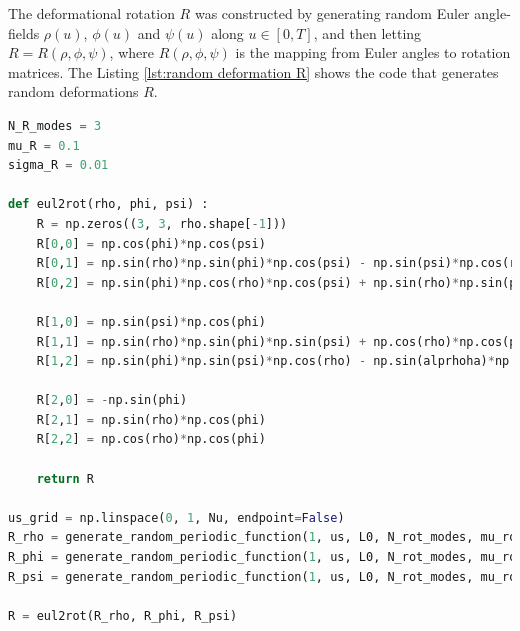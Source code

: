 \documentclass[withindex,glossary,techreport]{cam-thesis}
\begin{document}
\begin{appendices}
The deformational rotation $R$ was constructed by generating random Euler angle-fields $\rho(u)$, $\phi(u)$ and $\psi(u)$ along $u \in [0, T]$, and then letting $R = R(\rho, \phi, \psi)$, where $R(\rho, \phi, \psi)$ is the mapping from Euler angles to rotation matrices. The Listing \ref{lst:random deformation R} shows the code that generates random deformations $R$.

\begin{lstlisting}[language=Python, caption=Generating random deformational rotation field., label={lst:random deformation R}]
N_R_modes = 3
mu_R = 0.1
sigma_R = 0.01

def eul2rot(rho, phi, psi) :
    R = np.zeros((3, 3, rho.shape[-1]))
    R[0,0] = np.cos(phi)*np.cos(psi)
    R[0,1] = np.sin(rho)*np.sin(phi)*np.cos(psi) - np.sin(psi)*np.cos(rho)
    R[0,2] = np.sin(phi)*np.cos(rho)*np.cos(psi) + np.sin(rho)*np.sin(psi)
    
    R[1,0] = np.sin(psi)*np.cos(phi)
    R[1,1] = np.sin(rho)*np.sin(phi)*np.sin(psi) + np.cos(rho)*np.cos(psi)
    R[1,2] = np.sin(phi)*np.sin(psi)*np.cos(rho) - np.sin(alprhoha)*np.cos(psi)
    
    R[2,0] = -np.sin(phi)
    R[2,1] = np.sin(rho)*np.cos(phi)
    R[2,2] = np.cos(rho)*np.cos(phi)

    return R

us_grid = np.linspace(0, 1, Nu, endpoint=False)
R_rho = generate_random_periodic_function(1, us, L0, N_rot_modes, mu_rot, sigma_rot)[0]
R_phi = generate_random_periodic_function(1, us, L0, N_rot_modes, mu_rot, sigma_rot)[0]
R_psi = generate_random_periodic_function(1, us, L0, N_rot_modes, mu_rot, sigma_rot)[0]

R = eul2rot(R_rho, R_phi, R_psi)
\end{lstlisting}


\end{appendices}
\end{document}
